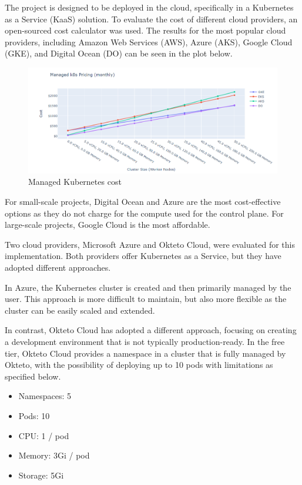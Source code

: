 The project is designed to be deployed in the cloud, specifically in a Kubernetes as a Service (KaaS) solution. To evaluate the cost of different cloud providers, an open-sourced cost calculator \cite{managed_kubernetes_pricing} was used. The results for the most popular cloud providers, including Amazon Web Services (AWS), Azure (AKS), Google Cloud (GKE), and Digital Ocean (DO) can be seen in the plot below.

\begin{figure}[H]
    \centering
    \includegraphics[width=\textwidth]{pictures/k8s_cost.png}
    \caption{ Managed Kubernetes cost }
    \label{fig:k8s_cost}
\end{figure}

For small-scale projects, Digital Ocean and Azure are the most cost-effective options as they do not charge for the compute used for the control plane. For large-scale projects, Google Cloud is the most affordable.

Two cloud providers, Microsoft Azure and Okteto Cloud, were evaluated for this implementation. Both providers offer Kubernetes as a Service, but they have adopted different approaches.

In Azure, the Kubernetes cluster is created and then primarily managed by the user. This approach is more difficult to maintain, but also more flexible as the cluster can be easily scaled and extended.

In contrast, Okteto Cloud has adopted a different approach, focusing on creating a development environment that is not typically production-ready. In the free tier, Okteto Cloud provides a namespace in a cluster that is fully managed by Okteto, with the possibility of deploying up to 10 pods with limitations as specified below.
\begin{itemize}
    \item Namespaces: 5
    \item Pods: 10
    \item CPU: 1 / pod
    \item Memory: 3Gi / pod
    \item Storage: 5Gi
\end{itemize}

